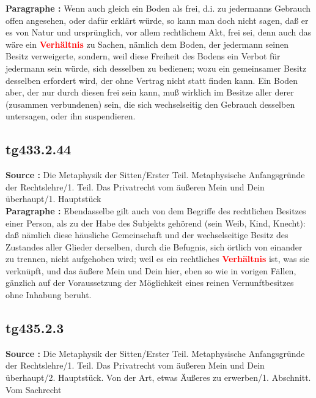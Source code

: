 \documentclass[a4paper,12pt,twoside]{book}
\newcommand{\match}[1]{\textcolor{red}{\textbf{#1}}}
\begin{document}
	\textbf{Paragraphe : }Wenn auch gleich ein Boden als frei, d.i. zu jedermanns Gebrauch offen angesehen, oder dafür erklärt würde, so kann man doch nicht sagen, daß er es von Natur und ursprünglich, vor allem rechtlichem Akt, frei sei, denn auch das wäre ein \match{Verhältnis} zu Sachen, nämlich dem Boden, der jedermann seinen Besitz verweigerte, sondern, weil diese Freiheit des Bodens ein Verbot für jedermann sein würde, sich desselben zu bedienen; wozu ein gemeinsamer Besitz desselben erfordert wird, der ohne Vertrag nicht statt finden kann. Ein Boden aber, der nur durch diesen frei sein kann, muß wirklich im Besitze aller derer (zusammen verbundenen) sein, die sich wechselseitig den Gebrauch desselben untersagen, oder ihn suspendieren. 
	
	\subsection*{tg433.2.44} 
	\textbf{Source : }Die Metaphysik der Sitten/Erster Teil. Metaphysische Anfangsgründe der Rechtslehre/1. Teil. Das Privatrecht vom äußeren Mein und Dein überhaupt/1. Hauptstück\\  
	
	\textbf{Paragraphe : }Ebendasselbe gilt auch von dem Begriffe des rechtlichen Besitzes einer Person, als zu der Habe des Subjekts gehörend (sein Weib, Kind, Knecht): daß nämlich diese häusliche Gemeinschaft und der wechselseitige Besitz des Zustandes aller Glieder derselben, durch die Befugnis, sich örtlich von einander zu trennen, nicht aufgehoben wird; weil es ein rechtliches \match{Verhältnis} ist, was sie verknüpft, und das äußere Mein und Dein hier, eben so wie in vorigen Fällen, gänzlich auf der Voraussetzung der Möglichkeit eines reinen Vernunftbesitzes ohne Inhabung beruht. 
	
	\subsection*{tg435.2.3} 
	\textbf{Source : }Die Metaphysik der Sitten/Erster Teil. Metaphysische Anfangsgründe der Rechtslehre/1. Teil. Das Privatrecht vom äußeren Mein und Dein überhaupt/2. Hauptstück. Von der Art, etwas Äußeres zu erwerben/1. Abschnitt. Vom Sachrecht\\  
	
\end{document}
